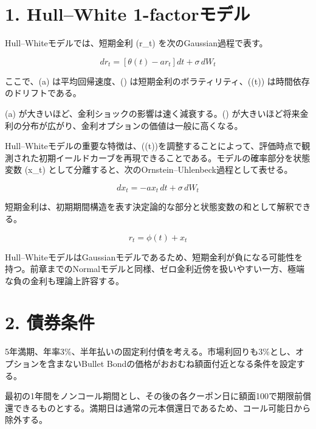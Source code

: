 \documentclass[
  letterpaper,
  DIV=11,
  numbers=noendperiod]{scrreprt}
\begin{document}
\section{1. Hull--White
1-factorモデル}\label{hullwhite-1-factorux30e2ux30c7ux30eb}

Hull--Whiteモデルでは、短期金利 (r\_t) を次のGaussian過程で表す。

\[
dr_t
=
\left[
\theta(t)-ar_t
\right]dt
+
\sigma\,dW_t
\]

ここで、(a) は平均回帰速度、(\sigma)
は短期金利のボラティリティ、(\theta(t)) は時間依存のドリフトである。

(a) が大きいほど、金利ショックの影響は速く減衰する。(\sigma)
が大きいほど将来金利の分布が広がり、金利オプションの価値は一般に高くなる。

Hull--Whiteモデルの重要な特徴は、(\theta(t))を調整することによって、評価時点で観測された初期イールドカーブを再現できることである。モデルの確率部分を状態変数
(x\_t) として分離すると、次のOrnstein--Uhlenbeck過程として表せる。

\[
dx_t
=
-ax_t\,dt
+
\sigma\,dW_t
\]

短期金利は、初期期間構造を表す決定論的な部分と状態変数の和として解釈できる。

\[
r_t
=
\phi(t)+x_t
\]

Hull--WhiteモデルはGaussianモデルであるため、短期金利が負になる可能性を持つ。前章までのNormalモデルと同様、ゼロ金利近傍を扱いやすい一方、極端な負の金利も理論上許容する。

\section{2. 債券条件}\label{ux50b5ux5238ux6761ux4ef6}

5年満期、年率3\%、半年払いの固定利付債を考える。市場利回りも3\%とし、オプションを含まないBullet
Bondの価格がおおむね額面付近となる条件を設定する。

最初の1年間をノンコール期間とし、その後の各クーポン日に額面100で期限前償還できるものとする。満期日は通常の元本償還日であるため、コール可能日から除外する。
\end{document}
